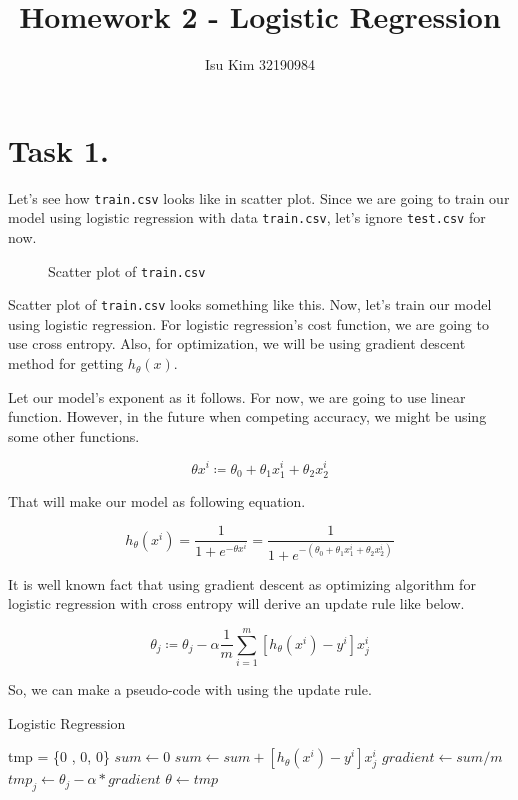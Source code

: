 \documentclass{homework}
\title{Homework 2 - Logistic Regression}
\author{Isu Kim 32190984}
\begin{document}
\maketitle

\section{Task 1.}
\label{sec:task1}
Let's see how \texttt{train.csv} looks like in scatter plot. Since we are going to train our model using logistic regression with data \texttt{train.csv}, let's ignore \texttt{test.csv} for now.

\begin{figure}[h]
    \begin{center}
        \resizebox{0.7\textwidth}{!}{}
    \end{center}
    \caption{Scatter plot of \texttt{train.csv}}
\end{figure}

Scatter plot of \texttt{train.csv} looks something like this. Now, let's train our model using logistic regression. For logistic regression's cost function, we are going to use cross entropy. Also, for optimization, we will be using gradient descent method for getting  $h_\theta(x)$.

Let our model's exponent as it follows. For now, we are going to use linear function. However, in the future when competing accuracy, we might be using some other functions. 

\[
    \theta x^i \coloneqq \theta_0 + \theta_1 x_1^i + \theta_2 x_2^i
\]

That will make our model as following equation.

\[
    h_\theta(x^i) = \frac{1}{1+e^{-\theta x ^i}} = \frac{1}{1+e^{-(\theta_0 + \theta_1 x_1^i + \theta_2 x_2^i)}}
\]

It is well known fact that using gradient descent as optimizing algorithm for logistic regression with cross entropy will derive an update rule like below.

\[
    \theta_j \coloneqq \theta_j - \alpha \frac{1}{m} \sum_{i=1}^{m} [h_\theta(x^i) - y^i]x_j^i
\]

So, we can make a pseudo-code with using the update rule. 

\begin{algorithm}
\caption{Logistic Regression}\label{alg:cap}
\begin{algorithmic}
    \State tmp = \{0 , 0, 0\}
        \State $sum \gets 0$
          
            \State $sum \gets sum + [h_\theta(x^i) - y^i]x_j^i$
        \EndFor
        \State $gradient \gets sum / m$
        \State $tmp_j \gets \theta_j - \alpha * gradient$ 
    \EndFor
    \State $\theta \gets tmp$ 
\EndWhile
\end{algorithmic}
\end{algorithm}
\end{document}
